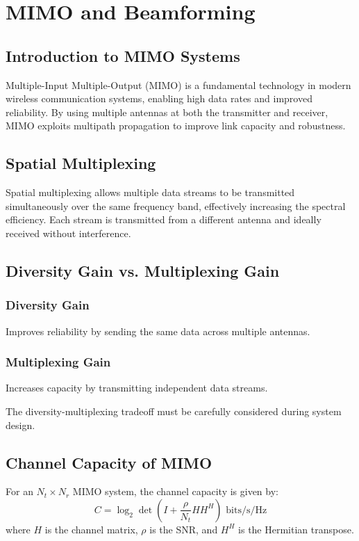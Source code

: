 
\chapter{MIMO and Beamforming}

\section{Introduction to MIMO Systems}
Multiple-Input Multiple-Output (MIMO) is a fundamental technology in modern wireless communication systems, enabling high data rates and improved reliability. By using multiple antennas at both the transmitter and receiver, MIMO exploits multipath propagation to improve link capacity and robustness.

\section{Spatial Multiplexing}
Spatial multiplexing allows multiple data streams to be transmitted simultaneously over the same frequency band, effectively increasing the spectral efficiency. Each stream is transmitted from a different antenna and ideally received without interference.

\section{Diversity Gain vs. Multiplexing Gain}
\subsection{Diversity Gain}
Improves reliability by sending the same data across multiple antennas.

\subsection{Multiplexing Gain}
Increases capacity by transmitting independent data streams.

The diversity-multiplexing tradeoff must be carefully considered during system design.

\section{Channel Capacity of MIMO}
For an $N_t \times N_r$ MIMO system, the channel capacity is given by:
\[
C = \log_2 \det \left( I + \frac{\rho}{N_t} HH^H \right) \text{ bits/s/Hz}
\]
where $H$ is the channel matrix, $\rho$ is the SNR, and $H^H$ is the Hermitian transpose.

